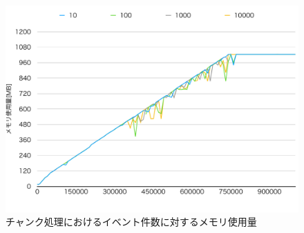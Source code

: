 \documentclass[../../../../../main]{subfiles}
\begin{document}
    \begin{figure}[H]
        \centering
        \includegraphics[width=12cm]{graph}
        \caption{チャンク処理におけるイベント件数に対するメモリ使用量}
        \label{fig:chunk-mem-app_1_1024-db_1_1024}
    \end{figure}
\end{document}
